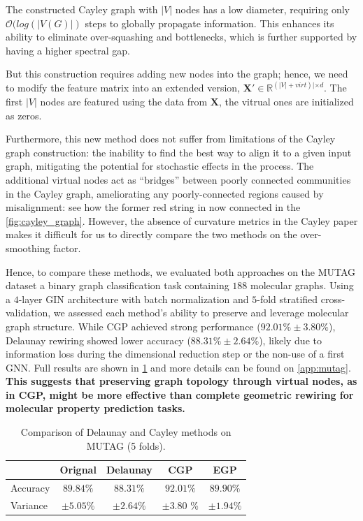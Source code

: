 \documentclass{article}
\theoremstyle{plain}
\theoremstyle{definition}
\theoremstyle{remark}
\begin{document}
The constructed Cayley graph with $|V|$ nodes has a low diameter, requiring only
$\mathcal{O}(log(|V(G)|)$ steps to globally propagate information. This enhances
its ability to eliminate over-squashing and bottlenecks, which is further 
supported by having a higher spectral gap.

But this construction requires adding new nodes into the graph; hence, we need to modify the feature
matrix into an extended version, $\mathbf{X}' \in \mathbb{R}^{(|V| + virt)| \times d}$.
The first $|V|$ nodes are featured using the data from $\mathbf{X}$, the vitrual 
ones are initialized as zeros.


Furthermore, this new method does not suffer from limitations of the Cayley graph construction:
the inability to find the best way to align it to a given input graph, mitigating the potential for
stochastic effects in the process. The additional virtual nodes act as “bridges” between poorly
connected communities in the Cayley graph, ameliorating any poorly-connected regions caused by
misalignment: see how the former red string in now connected in the \cref{fig:cayley_graph}.
However, the absence of curvature metrics in the Cayley paper makes it difficult for us
to directly compare the two methods on the over-smoothing factor.


Hence, to compare these methods, we evaluated both approaches on the MUTAG dataset \cite{doi:10.1021/jm00106a046} 
a binary graph classification task containing $188$ molecular graphs. Using 
a $4$-layer GIN architecture with batch normalization and $5$-fold stratified 
cross-validation, we assessed each method's ability to preserve and leverage molecular 
graph structure. While CGP achieved strong performance ($92.01\% \pm 3.80\%$), 
Delaunay rewiring showed lower accuracy ($88.31\% \pm 2.64\%$), likely due to 
information loss during the dimensional reduction step or the non-use of a first GNN.
 Full results are shown
in \cref{tab:cross_results} and more details can be found on \cref{app:mutag}.
\textbf{This suggests that preserving 
graph topology through virtual nodes, as in CGP, might be more effective than 
complete geometric rewiring for molecular property prediction tasks.}


\begin{table}[hb]
    \caption{Comparison of Delaunay and Cayley methods on MUTAG (5 folds).}
    \centering
    \small
    \begin{tabular}{|l|c|c|c|c| }
        \hline
                 & \textbf{Orignal} & \textbf{Delaunay} & \textbf{CGP} & \textbf{EGP}\\ \hline
        Accuracy & $89.84\%$   & $88.31\%$ & $92.01\%$ & $89.90\%$      \\ \hline
        Variance  & $\pm 5.05\%$ & $\pm 2.64\%$  & $\pm 3.80$ \% & $\pm 1.94\%$ \\ \hline
    \end{tabular}
    \label{tab:cross_results}
\end{table}
\end{document}
